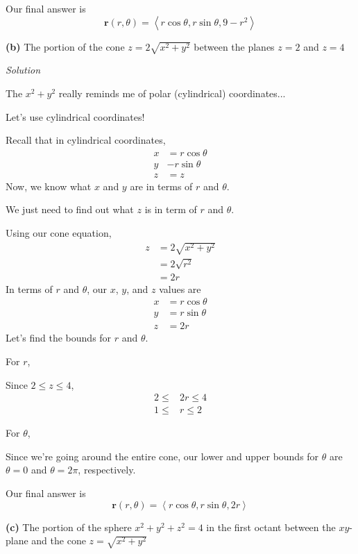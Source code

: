 \documentclass{article}
\newcommand{\lra}[1]{\left\langle #1 \right\rangle}
\renewcommand{\r}[0]{\mathbf{r}}
\newcommand{\Solution}{\textit{Solution}}
\begin{document}
Our final answer is
\begin{equation*}
    \boxed{\r(r,\theta)=\lra{r\cos \theta, r\sin\theta, 9-r^2}}\tag{$0\leq r\leq 3$, $0\leq \theta\leq 2\pi$}
\end{equation*}
{}\textbf{(b)} The portion of the cone $z=2\sqrt{x^2+y^2}$ between the planes $z=2$ and $z=4$

\Solution

The $x^2+y^2$ really reminds me of polar (cylindrical) coordinates...

Let's use cylindrical coordinates!

Recall that in cylindrical coordinates,
\begin{align*}
    x&=r\cos \theta\\
    y&-r\sin\theta\\
    z&=z
\end{align*}
Now, we know what $x$ and $y$ are in terms of $r$ and $\theta$.

We just need to find out what $z$ is in term of $r$ and $\theta$.

Using our cone equation,
\begin{align*}
    z&=2\sqrt{x^2+y^2}\\
    &=2\sqrt{r^2}\tag{in polar, $x^2+y^2=r^2$}\\
    &=2r\tag{$r\geq 0$ is always true}
\end{align*}
In terms of $r$ and $\theta$, our $x$, $y$, and $z$ values are
\begin{align*}
    x&=r\cos\theta\\
    y&=r\sin\theta\\
    z&=2r
\end{align*}
Let's find the bounds for $r$ and $\theta$.

For $r$,

Since $2\leq z\leq 4$,
\begin{align*}
    2\leq &2r\leq 4\\
    1\leq & r\leq 2
\end{align*}

For $\theta$,

Since we're going around the entire cone, our lower and upper bounds for $\theta$ are $\theta=0$ and $\theta=2\pi$, respectively.

Our final answer is
\begin{equation*}
    \boxed{\r(r,\theta)=\lra{r\cos \theta, r\sin \theta, 2r}}\tag{$1\leq r\leq 2$, $0\leq \theta\leq 2\pi$}
\end{equation*}
{}\textbf{(c)} The portion of the sphere $x^2+y^2+z^2=4$ in the first octant between the $xy$-plane
and the cone $z=\sqrt{x^2+y^2}$
\end{document}
